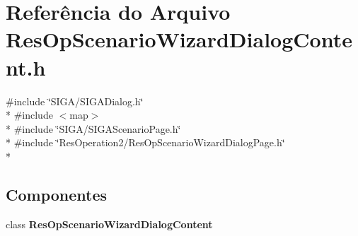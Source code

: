 \section{Referência do Arquivo Res\+Op\+Scenario\+Wizard\+Dialog\+Content.\+h}
\label{_res_op_scenario_wizard_dialog_content_8h}
{\ttfamily \#include \char`\"{}S\+I\+G\+A/\+S\+I\+G\+A\+Dialog.\+h\char`\"{}}\\*
{\ttfamily \#include $<$map$>$}\\*
{\ttfamily \#include \char`\"{}S\+I\+G\+A/\+S\+I\+G\+A\+Scenario\+Page.\+h\char`\"{}}\\*
{\ttfamily \#include \char`\"{}Res\+Operation2/\+Res\+Op\+Scenario\+Wizard\+Dialog\+Page.\+h\char`\"{}}\\*
\subsection*{Componentes}
\begin{DoxyCompactItemize}
\item 
class {\bf Res\+Op\+Scenario\+Wizard\+Dialog\+Content}
\end{DoxyCompactItemize}
